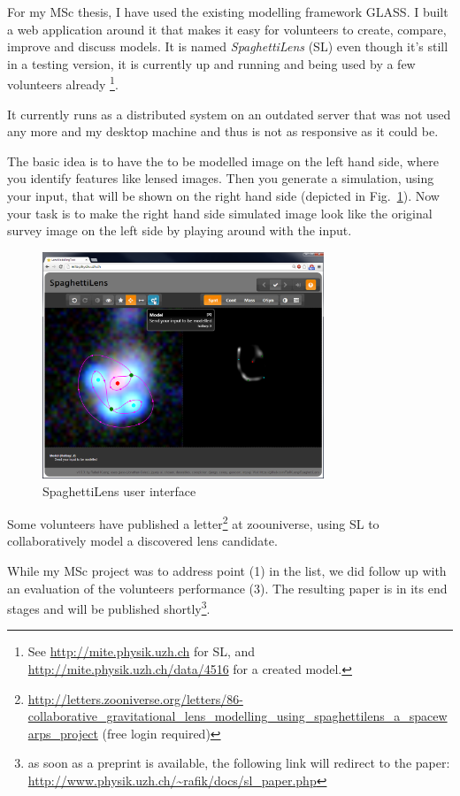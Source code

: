 \documentclass[11pt]{article}
\begin{document}
For my MSc thesis, I have used the existing modelling framework GLASS\cite{glass}.
I built a web application around it that makes it easy for volunteers to create, compare, improve and discuss models.
It is named \emph{SpaghettiLens} (SL) even though it's still in a testing version, it is currently up and running and being used by a few volunteers already
\footnote{See \url{http://mite.physik.uzh.ch} for SL, and \url{http://mite.physik.uzh.ch/data/4516} for a created model.}.

It currently runs as a distributed system on an outdated server that was not used any more and my desktop machine and thus is not as responsive as it could be.

The basic idea is to have the to be modelled image on the left hand side, where you identify features like lensed images.
Then you generate a simulation, using your input, that will be shown on the right hand side (depicted in Fig.~\ref{fig:client_screen}).
Now your task is to make the right hand side simulated image look like the original survey image on the left side by playing around with the input.

\begin{figure}
	\centering
		\includegraphics[width=0.75\textwidth]{img/client_screen.png}
	\caption{SpaghettiLens user interface}
	\label{fig:client_screen}
\end{figure}


Some volunteers have published a letter\footnote{\url{http://letters.zooniverse.org/letters/86-collaborative_gravitational_lens_modelling_using_spaghettilens_a_spacewarps_project} (free login required)} at zoouniverse, using SL to collaboratively model a discovered lens candidate.


While my MSc project was to address point (1) in the list, we did follow up with an evaluation of the volunteers performance (3).
The resulting paper is in its end stages and will be published shortly\footnote{as soon as a preprint is available, the following link will redirect to the paper:
\url{http://www.physik.uzh.ch/~rafik/docs/sl_paper.php}}.
\end{document}

